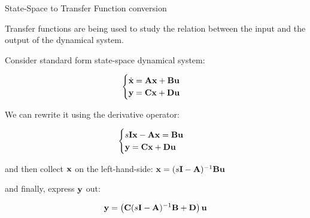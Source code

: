 \documentclass{beamer}
\begin{document}
\begin{frame}{State-Space to Transfer Function conversion}
\begin{flushleft}

Transfer functions are being used to study the relation between the input and the output of the dynamical system.

\bigskip

Consider standard form state-space dynamical system:

\begin{equation}
\begin{cases}
\dot{\mathbf{x}} = \mathbf{A}\mathbf{x} + \mathbf{B}\mathbf{u} \\
     \mathbf{y}  = \mathbf{C}\mathbf{x} + \mathbf{D}\mathbf{u}
\end{cases}
\end{equation}

We can rewrite it using the derivative operator:

\begin{equation}
\begin{cases}
s\mathbf{I}\mathbf{x} -\mathbf{A}\mathbf{x} = \mathbf{B}\mathbf{u} \\
\mathbf{y}  = \mathbf{C}\mathbf{x} + \mathbf{D}\mathbf{u}
\end{cases}
\end{equation}

and then collect $\mathbf{x}$ on the left-hand-side: $\mathbf{x} = (s\mathbf{I} -\mathbf{A})^{-1} \mathbf{B}\mathbf{u}$

and finally, express $\mathbf{y}$ out:

\begin{equation}
\mathbf{y}  = \left( \mathbf{C}(s\mathbf{I} -\mathbf{A})^{-1} \mathbf{B} + \mathbf{D} \right) \mathbf{u}
\end{equation}

\end{flushleft}
\end{frame}
\end{document}
